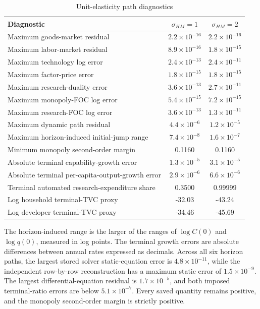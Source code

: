 \begin{table}[H]
\centering
\small
\caption{Unit-elasticity path diagnostics}
\label{tab:axm-residuals}
\begin{tabular}{lcc}
\toprule
Diagnostic & \(\sigma_{HM}=1\) & \(\sigma_{HM}=2\)\\
\midrule
Maximum goods-market residual & \(2.2\times10^{-16}\) & \(2.2\times10^{-16}\)\\
Maximum labor-market residual & \(8.9\times10^{-16}\) & \(1.8\times10^{-15}\)\\
Maximum technology log error & \(2.4\times10^{-13}\) & \(2.4\times10^{-11}\)\\
Maximum factor-price error & \(1.8\times10^{-15}\) & \(1.8\times10^{-15}\)\\
Maximum research-duality error & \(3.6\times10^{-13}\) & \(2.7\times10^{-11}\)\\
Maximum monopoly-FOC log error & \(5.4\times10^{-15}\) & \(7.2\times10^{-15}\)\\
Maximum research-FOC log error & \(3.6\times10^{-13}\) & \(1.3\times10^{-11}\)\\
Maximum dynamic path residual & \(4.4\times10^{-6}\) & \(1.2\times10^{-5}\)\\
Maximum horizon-induced initial-jump range & \(7.4\times10^{-8}\) & \(1.6\times10^{-7}\)\\
Minimum monopoly second-order margin & 0.1160 & 0.1160\\
Absolute terminal capability-growth error & \(1.3\times10^{-5}\) & \(3.1\times10^{-5}\)\\
Absolute terminal per-capita-output-growth error & \(2.9\times10^{-6}\) & \(6.6\times10^{-6}\)\\
Terminal automated research-expenditure share & 0.3500 & 0.99999\\
Log household terminal-TVC proxy & -32.03 & -43.24\\
Log developer terminal-TVC proxy & -34.46 & -45.69\\
\bottomrule
\end{tabular}
\end{table}

The horizon-induced range is the larger of the ranges of \(\log C(0)\) and
\(\log q(0)\), measured in log points. The terminal growth errors are absolute
differences between annual rates expressed as decimals. Across all six horizon
paths, the largest stored solver static-equation error is
\(4.8\times10^{-11}\), while the independent row-by-row reconstruction has a
maximum static error of \(1.5\times10^{-9}\). The largest differential-equation
residual is \(1.7\times10^{-5}\), and both imposed terminal-ratio errors are below
\(5.1\times10^{-7}\). Every saved quantity remains positive, and the monopoly
second-order margin is strictly positive.

